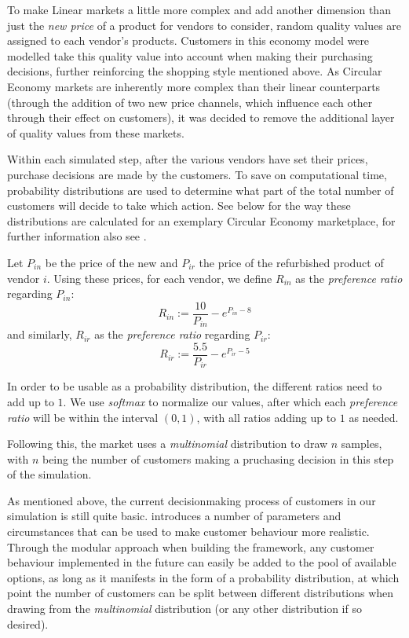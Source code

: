 To make Linear markets a little more complex and add another dimension than just the \emph{new price} of a product for vendors to consider, random quality values are assigned to each vendor's products. Customers in this economy model were modelled take this quality value into account when making their purchasing decisions, further reinforcing the shopping style mentioned above. As Circular Economy markets are inherently more complex than their linear counterparts (through the addition of two new price channels, which influence each other through their effect on customers), it was decided to remove the additional layer of quality values from these markets.

Within each simulated step, after the various vendors have set their prices, purchase decisions are made by the customers. To save on computational time, probability distributions are used to determine what part of the total number of customers will decide to take which action. See below for the way these distributions are calculated for an exemplary Circular Economy marketplace, for further information also see \cite{NickThesis}.

\begin{definition}\label{def:customerDecisions}
	Let \(P_{in}\) be the price of the new and \(P_{ir}\) the price of the refurbished product of vendor \(i\). Using these prices, for each vendor, we define \(R_{in}\) as the \emph{preference ratio} regarding \(P_{in}\):
	\[
		R_{in} := \frac{10}{P_{in}} - e^{P_{in} - 8}
	\]
	and similarly, \(R_{ir}\) as the \emph{preference ratio} regarding \(P_{ir}\):
	\[
		R_{ir} := \frac{5.5}{P_{ir}} - e^{P_{ir} - 5}
	\]
\end{definition}

In order to be usable as a probability distribution, the different ratios need to add up to \(1\). We use \emph{softmax} to normalize our values, after which each \emph{preference ratio} will be within the interval \((0,1)\), with all ratios adding up to \(1\) as needed.

Following this, the market uses a \emph{multinomial} distribution to draw \(n\) samples, with \(n\) being the number of customers making a pruchasing decision in this step of the simulation.

As mentioned above, the current decisionmaking process of customers in our simulation is still quite basic.  introduces a number of parameters and circumstances that can be used to make customer behaviour more realistic. Through the modular approach when building the framework, any customer behaviour implemented in the future can easily be added to the pool of available options, as long as it manifests in the form of a probability distribution, at which point the number of customers can be split between different distributions when drawing from the \emph{multinomial} distribution (or any other distribution if so desired).


